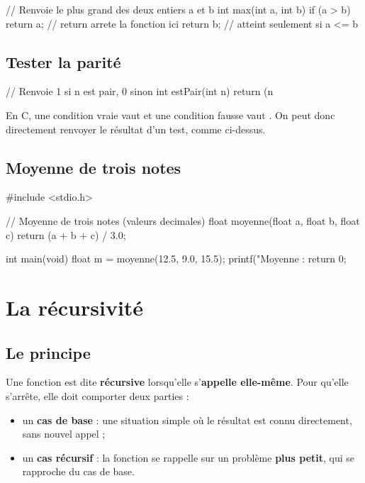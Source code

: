 \begin{codec}
// Renvoie le plus grand des deux entiers a et b
int max(int a, int b) {
    if (a > b) {
        return a;        // return arrete la fonction ici
    }
    return b;            // atteint seulement si a <= b
}
\end{codec}

\subsection{Tester la parité}

\begin{codec}
// Renvoie 1 si n est pair, 0 sinon
int estPair(int n) {
    return (n %
}
\end{codec}

\begin{remarque}
En C, une condition vraie vaut  et une condition fausse vaut .
On peut donc directement renvoyer le résultat d'un test, comme ci-dessus.
\end{remarque}

\subsection{Moyenne de trois notes}

\begin{codec}
#include <stdio.h>

// Moyenne de trois notes (valeurs decimales)
float moyenne(float a, float b, float c) {
    return (a + b + c) / 3.0;
}

int main(void) {
    float m = moyenne(12.5, 9.0, 15.5);
    printf("Moyenne : %
    return 0;
}
\end{codec}

\section{La récursivité}

\subsection{Le principe}

\begin{definition}
Une fonction est dite \textbf{récursive} lorsqu'elle s'\textbf{appelle elle-même}.
Pour qu'elle s'arrête, elle doit comporter deux parties :
\begin{itemize}
  \item un \textbf{cas de base} : une situation simple où le résultat est connu
        directement, sans nouvel appel ;
  \item un \textbf{cas récursif} : la fonction se rappelle sur un problème
        \textbf{plus petit}, qui se rapproche du cas de base.
\end{itemize}
\end{definition}

